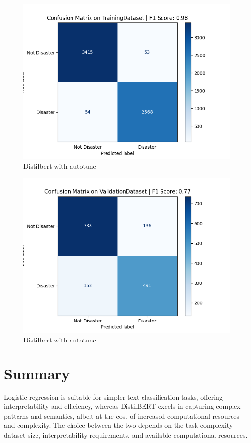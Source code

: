 \begin{figure}[ht]
    \centering
    \includegraphics[scale=0.7]{figures/Distilbert_autotune_Training_confusion_matrix.png}
    \caption{Distilbert with autotune}
\end{figure}

\begin{figure}[ht]
    \centering
    \includegraphics[scale=0.7]{figures/Distilbert_autotune_Validation_confusion_matrix.png}
    \caption{Distilbert with autotune}
\end{figure}

\newpage
\section{Summary}
Logistic regression is suitable for simpler text classification tasks, offering interpretability and efficiency, whereas DistilBERT excels in capturing complex patterns and semantics, albeit at the cost of increased computational resources and complexity. The choice between the two depends on the task complexity, dataset size, interpretability requirements, and available computational resources.

